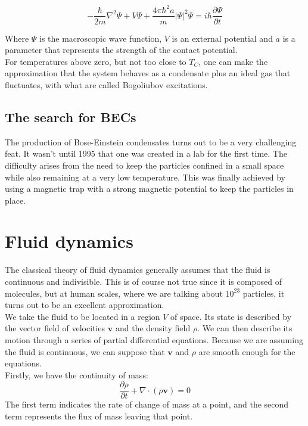 \documentclass{article}
\begin{document}
\[-\frac{\hbar}{2m}\nabla^2\Psi+V\Psi+\frac{4\pi\hbar^2a}{m}|\Psi|^2\Psi=i\hbar \frac{\partial \Psi}{\partial t}\]

Where $\Psi$ is the macroscopic wave function, $V$ is an external potential and $a$ is a parameter that represents the strength of the contact potential.
\\

For temperatures above zero, but not too close to $T_C$, one can make the approximation that the system behaves as a condensate plus an ideal gas that fluctuates, with what are called Bogoliubov excitations.
\subsection{The search for BECs}

The production of Bose-Einstein condensates turns out to be a very challenging feat.  It wasn't until 1995 that one was created in a lab for the first time.  The difficulty arises from the need to keep the particles confined in a small space while also remaining at a very low temperature.  This was finally achieved by using a magnetic trap with a strong magnetic potential to keep the particles in place.

\section{Fluid dynamics}
The classical theory of fluid dynamics generally assumes that the fluid is
continuous and indivisible.  This is of course not true since it is composed
of molecules, but at human scales, where we are talking about $10^{23}$
particles, it turns out to be an excellent approximation.
\\

We take the fluid to be located in a region $V$ of space.  Its state is
described by the vector field of velocities $\mathbf{v}$ and the density
field $\rho$.  We can then describe its motion through a series of partial
differential equations.  Because we are assuming the fluid is continuous, we
can suppose that $\mathbf{v}$ and $\rho$ are smooth enough for the equations.
\\

Firstly, we have the continuity of mass:
\[\frac{\partial\rho}{\partial t} + \nabla\cdot(\rho\mathbf{v}) = 0\]
The first term indicates the rate of change of mass at a point, and the second
term represents the flux of mass leaving that point.
\\
\end{document}
